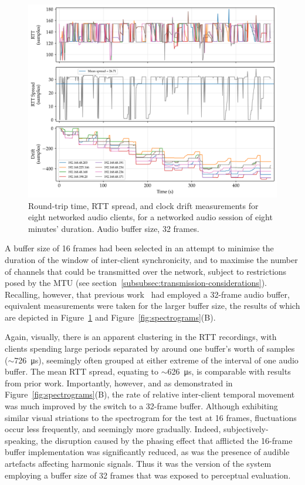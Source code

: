 \documentclass[utf8]{FrontiersinHarvard}
\newcommand{\figref}[1]{Figure~\ref{#1}}
\newcommand{\secref}[1]{section~\ref{#1}}
\begin{document}
    \begin{figure}[h]
        \centering
        \includegraphics[width=\textwidth]{figures/rtt_drift_32}
        \caption{
            Round-trip time, RTT spread, and clock drift measurements
            for eight networked audio clients, for a networked audio session of
            eight minutes' duration.
            Audio buffer size, 32 frames.
        }
        \label{fig:rtt-drift-32}
    \end{figure}

    A buffer size of 16 frames had been selected in an attempt to minimise the
    duration of the window of inter-client synchronicity, and to maximise the
    number of channels that could be transmitted over the network, subject to
    restrictions posed by the MTU (see
    \secref{subsubsec:transmission-considerations}).
    Recalling, however, that previous
    work~\citep{rushton_microcontroller-based_2023}
    had employed a 32-frame audio buffer, equivalent measurements were taken for
    the larger buffer size, the results of which are depicted in
    \figref{fig:rtt-drift-32} and \figref{fig:spectrograms}(B).

    Again, visually, there is an apparent clustering in the RTT recordings, with
    clients spending large periods separated by around one buffer's worth of
    samples ($\sim$\qty{726}{\us}), seemingly often grouped at either
    extreme of the interval of one audio buffer.
    The mean RTT spread, equating to $\sim$\qty{626}{\us}, is comparable with
    results from prior work.
    Importantly, however, and as demonstrated in \figref{fig:spectrograms}(B), the
    rate of relative inter-client temporal movement was much improved by the switch
    to a 32-frame buffer.
    Although exhibiting similar visual striations to the spectrogram for the test
    at 16 frames, fluctuations occur less frequently, and seemingly more
    gradually.
    Indeed, subjectively-speaking, the disruption caused by the phasing effect
    that afflicted the 16-frame buffer implementation was significantly reduced,
    as was the presence of audible artefacts affecting harmonic signals.
    Thus it was the version of the system employing a buffer size of 32 frames
    that was exposed to perceptual evaluation.
\end{document}
